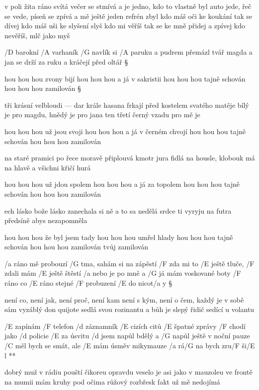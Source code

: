 v poli žita ráno svítá večer se stmívá
a je jedno, kdo to vlastně byl
auto jede, řeč se vede, píseň se zpívá
a mě ještě jeden refrén zbyl
kdo máš oči ke koukání tak se dívej
kdo máš uši ke slyšení slyš
kdo mi věříš tak se ke mně přidej a zpívej
kdo nevěříš, mlč jako myš




/D barokní /A varhaník /G navlík si /A paruku
a pudrem přemázl tvář
magda a jan se drží za ruku
a kráčejí před oltář \S

hou hou hou zvony bijí
hou hou hou a já v sakristii
hou hou hou tajně schován
hou hou hou zamilován \S

tři krásní velbloudi --- dar krále hasana
frkají před kostelem svatého matěje
bílý je pro magdu, hnědý je pro jana
ten třetí černý vzadu pro mě je \s

hou hou hou už jsou svoji
hou hou hou a já v černém chvojí
hou hou hou tajně schován
hou hou hou zamilován \s

na staré pramici po řece moravě
připlouvá kmotr jura
fidlá na housle, klobouk má na hlavě
a všichni křičí hurá \s

hou hou hou už jdou spolem
hou hou hou a já za topolem
hou hou hou tajně schován
hou hou hou zamilován \s

ech lásko bože lásko
zanechala si ně
a to sa nedělá
srdce ti vyryju na futra předsíně
abys nezapomněla \s

hou hou hou že byl jsem tady
hou hou hou umřel hlady
hou hou hou tajně schován
hou hou hou zamilován
tvůj zamilován




/a ráno mě probouzí /G tma, sahám si na zápěstí
/F zda mi to /E ještě tluče, /F zdali mám /E ještě štěstí
/a nebo je po mně a /G já mám voskované boty
/F ráno co /E ráno stejné /F probuzení /E do nicot/a y \S

není co, není jak, není proč, není kam
není s kým, není o čem, každý je v sobě sám
vyzáblý don quijote sedlá svou rozinantu
a bůh je slepý řidič sedící u volantu

\R /E zapínám /F telefon /d záznamník /E cizích citů
   /E špatné zprávy /F chodí jako /d policie /E za úsvitu
   /d jsem napůl bdělý a /G napůl ještě v noční pauze
   /C měl bych se smát, ale /E mám úsměv mikymauze
   /a rá/G na bych zru/F ši/E l **

dobrý muž v rádiu pouští čikoreu
opravdu veselo je asi jako v mauzoleu
ve frontě na mumii mám kruhy pod očima
růžový rozbřesk fakt už mě nedojímá \s

